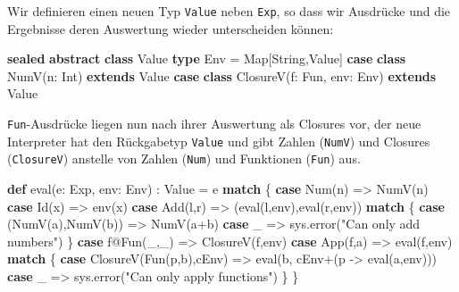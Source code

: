 \documentclass[]{article}
\newenvironment{Shaded}{}{}
\newcommand{\FunctionTok}[1]{\textcolor[rgb]{0.02,0.16,0.49}{#1}}
\newcommand{\KeywordTok}[1]{\textcolor[rgb]{0.00,0.44,0.13}{\textbf{#1}}}
\newcommand{\NormalTok}[1]{#1}
\newcommand{\StringTok}[1]{\textcolor[rgb]{0.25,0.44,0.63}{#1}}
\begin{document}
Wir definieren einen neuen Typ \texttt{Value} neben \texttt{Exp}, so
dass wir Ausdrücke und die Ergebnisse deren Auswertung wieder
unterscheiden können:

\begin{Shaded}
\begin{Highlighting}[]
\KeywordTok{sealed} \KeywordTok{abstract} \KeywordTok{class}\NormalTok{ Value}
\KeywordTok{type}\NormalTok{ Env = Map[String,Value]}
\KeywordTok{case} \KeywordTok{class} \FunctionTok{NumV}\NormalTok{(n: Int) }\KeywordTok{extends}\NormalTok{ Value}
\KeywordTok{case} \KeywordTok{class} \FunctionTok{ClosureV}\NormalTok{(f: Fun, env: Env) }\KeywordTok{extends}\NormalTok{ Value}
\end{Highlighting}
\end{Shaded}

\texttt{Fun}-Ausdrücke liegen nun nach ihrer Auswertung als Closures
vor, der neue Interpreter hat den Rückgabetyp \texttt{Value} und gibt
Zahlen (\texttt{NumV}) und Closures (\texttt{ClosureV}) anstelle von
Zahlen (\texttt{Num}) und Funktionen (\texttt{Fun}) aus.

\begin{Shaded}
\begin{Highlighting}[]
\KeywordTok{def} \FunctionTok{eval}\NormalTok{(e: Exp, env: Env) : Value = e }\KeywordTok{match}\NormalTok{ \{}
  \KeywordTok{case} \FunctionTok{Num}\NormalTok{(n) =\textgreater{} }\FunctionTok{NumV}\NormalTok{(n)}
  \KeywordTok{case} \FunctionTok{Id}\NormalTok{(x) =\textgreater{} }\FunctionTok{env}\NormalTok{(x)}
  \KeywordTok{case} \FunctionTok{Add}\NormalTok{(l,r) =\textgreater{} (}\FunctionTok{eval}\NormalTok{(l,env),}\FunctionTok{eval}\NormalTok{(r,env)) }\KeywordTok{match}\NormalTok{ \{}
    \KeywordTok{case}\NormalTok{ (}\FunctionTok{NumV}\NormalTok{(a),}\FunctionTok{NumV}\NormalTok{(b)) =\textgreater{} }\FunctionTok{NumV}\NormalTok{(a+b)}
    \KeywordTok{case}\NormalTok{ \_ =\textgreater{} sys.}\FunctionTok{error}\NormalTok{(}\StringTok{"Can only add numbers"}\NormalTok{)}
\NormalTok{  \}}
  \KeywordTok{case}\NormalTok{ f@}\FunctionTok{Fun}\NormalTok{(\_,\_) =\textgreater{} }\FunctionTok{ClosureV}\NormalTok{(f,env)}
  \KeywordTok{case} \FunctionTok{App}\NormalTok{(f,a) =\textgreater{} }\FunctionTok{eval}\NormalTok{(f,env) }\KeywordTok{match}\NormalTok{ \{}
    \KeywordTok{case} \FunctionTok{ClosureV}\NormalTok{(}\FunctionTok{Fun}\NormalTok{(p,b),cEnv) =\textgreater{}}
      \FunctionTok{eval}\NormalTok{(b, cEnv+(p {-}\textgreater{} }\FunctionTok{eval}\NormalTok{(a,env)))}
    \KeywordTok{case}\NormalTok{ \_ =\textgreater{} sys.}\FunctionTok{error}\NormalTok{(}\StringTok{"Can only apply functions"}\NormalTok{)}
\NormalTok{  \}}
\NormalTok{\}}
\end{Highlighting}
\end{Shaded}
\end{document}
